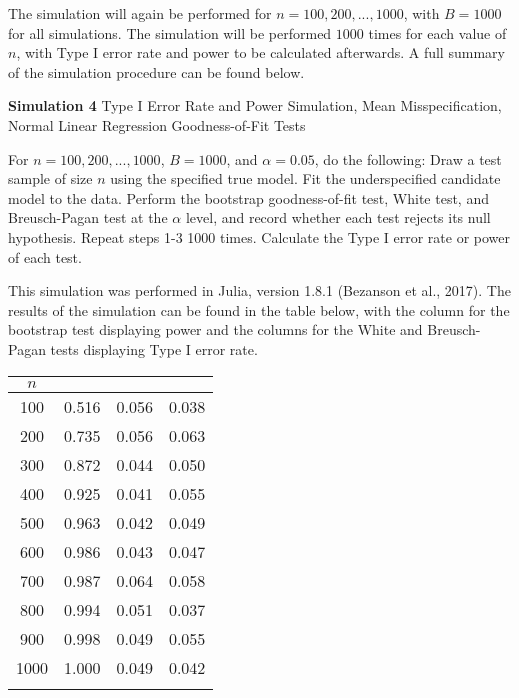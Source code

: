 		The simulation will again be performed for $n = 100,200,...,1000$, with $B = 1000$ for all simulations. The simulation will be performed $1000$ times for each value of $n$, with
		Type I error rate and power to be calculated afterwards. A full summary of the simulation procedure can be found below.
		\begin{algorithm}[H]
			\caption*{\textbf{Simulation 4} Type I Error Rate and Power Simulation, Mean Misspecification, Normal Linear Regression Goodness-of-Fit Tests}
			\begin{algorithmic}[1]
			  \Statex For $n = 100,200,...,1000$, $B = 1000$, and $\alpha = 0.05$, do the following:
			  \State Draw a test sample of size $n$ using the specified true model.
			  \State Fit the underspecified candidate model to the data.
			  \State Perform the bootstrap goodness-of-fit test, White test, and Breusch-Pagan test at the $\alpha$ level,
			  and record whether each test rejects its null hypothesis.
			  \State Repeat steps 1-3 1000 times.
			  \State Calculate the Type I error rate or power of each test.
			\end{algorithmic}
		\end{algorithm}

		This simulation was performed in Julia, version 1.8.1 (Bezanson et al., 2017). The results of the simulation can be found in the table below, with the column for the
		bootstrap test displaying power and the columns for the White and Breusch-Pagan tests displaying Type I error rate.

		\begin{table}[H]
			\centering
			\small\addtolength{\tabcolsep}{-3pt}
			\setlength\extrarowheight{-3pt}
			{
			\begin{tabular}{ c|c|c|c}
			$n$ & \vtop{\hbox{\strut Bootstrap}\hbox{\strut Test}} & \vtop{\hbox{\strut White}\hbox{\strut Test}} & \vtop{\hbox{\strut Breusch-Pagan} \hbox{\strut Test}} \\
			 \hline
			 100 & 0.516 & 0.056 & 0.038 \\
			 200 & 0.735 & 0.056 & 0.063 \\
			 300 & 0.872 & 0.044 & 0.050 \\
			 400 & 0.925 & 0.041 & 0.055 \\
			 500 & 0.963 & 0.042 & 0.049 \\
			 600 & 0.986 & 0.043 & 0.047 \\
			 700 & 0.987 & 0.064 & 0.058 \\
			 800 & 0.994 & 0.051 & 0.037 \\
			 900 & 0.998 & 0.049 & 0.055 \\
			 1000 & 1.000 & 0.049 & 0.042 \\
			 
			 \Xhline{3\arrayrulewidth}
			\end{tabular}
			}
		\end{table}

